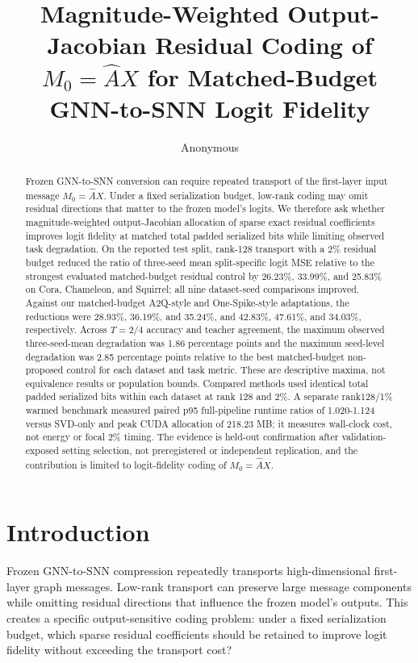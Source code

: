\documentclass{article}
\title{Magnitude-Weighted Output-Jacobian Residual Coding of \(M_0=\hat{A}X\) for Matched-Budget GNN-to-SNN Logit Fidelity}
\author{Anonymous}
\begin{document}
\begin{abstract}
Frozen GNN-to-SNN conversion can require repeated transport of the first-layer input message \(M_0=\hat{A}X\). Under a fixed serialization budget, low-rank coding may omit residual directions that matter to the frozen model's logits. We therefore ask whether magnitude-weighted output-Jacobian allocation of sparse exact residual coefficients improves logit fidelity at matched total padded serialized bits while limiting observed task degradation. On the reported test split, rank-128 transport with a 2\% residual budget reduced the ratio of three-seed mean split-specific logit MSE relative to the strongest evaluated matched-budget residual control by 26.23\%, 33.99\%, and 25.83\% on Cora, Chameleon, and Squirrel; all nine dataset-seed comparisons improved. Against our matched-budget A2Q-style and One-Spike-style adaptations, the reductions were 28.93\%, 36.19\%, and 35.24\%, and 42.83\%, 47.61\%, and 34.03\%, respectively. Across \(T=2/4\) accuracy and teacher agreement, the maximum observed three-seed-mean degradation was 1.86 percentage points and the maximum seed-level degradation was 2.85 percentage points relative to the best matched-budget non-proposed control for each dataset and task metric. These are descriptive maxima, not equivalence results or population bounds. Compared methods used identical total padded serialized bits within each dataset at rank 128 and 2\%. A separate rank128/1\% warmed benchmark measured paired p95 full-pipeline runtime ratios of 1.020-1.124 versus SVD-only and peak CUDA allocation of 218.23 MB; it measures wall-clock cost, not energy or focal 2\% timing. The evidence is held-out confirmation after validation-exposed setting selection, not preregistered or independent replication, and the contribution is limited to logit-fidelity coding of \(M_0=\hat{A}X\).
\end{abstract}

\maketitle

\section{Introduction}

\label{sec:introduction}

Frozen GNN-to-SNN compression repeatedly transports high-dimensional first-layer graph messages. Low-rank transport can preserve large message components while omitting residual directions that influence the frozen model's outputs. This creates a specific output-sensitive coding problem: under a fixed serialization budget, which sparse residual coefficients should be retained to improve logit fidelity without exceeding the transport cost?
\end{document}
